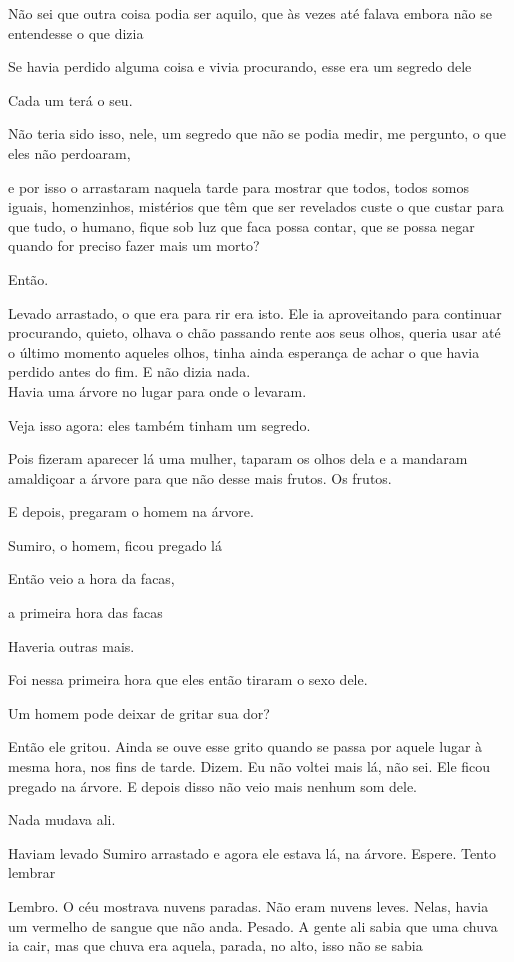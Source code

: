 Não sei que outra coisa podia ser aquilo, que às vezes até falava embora
não se entendesse o que dizia

Se havia perdido alguma coisa e vivia procurando, esse era um segredo
dele

Cada um terá o seu.

Não teria sido isso, nele, um segredo que não se podia medir, me
pergunto, o que eles não perdoaram,

e por isso o arrastaram naquela tarde para mostrar que todos, todos
somos iguais, homenzinhos, mistérios que têm que ser revelados custe o
que custar para que tudo, o humano, fique sob luz que faca possa contar,
que se possa negar quando for preciso fazer mais um morto?

Então.

Levado arrastado, o que era para rir era isto. Ele ia aproveitando para
continuar procurando, quieto, olhava o chão passando rente aos seus
olhos, queria usar até o último momento aqueles olhos, tinha ainda
esperança de achar o que havia perdido antes do fim. E não dizia nada.\\

Havia uma árvore no lugar para onde o levaram.

Veja isso agora: eles também tinham um segredo.

Pois fizeram aparecer lá uma mulher, taparam os olhos dela e a mandaram
amaldiçoar a árvore para que não desse mais frutos. Os frutos.

E depois, pregaram o homem na árvore.

Sumiro, o homem, ficou pregado lá

Então veio a hora da facas,

a primeira hora das facas

Haveria outras mais.

Foi nessa primeira hora que eles então tiraram o sexo dele.

Um homem pode deixar de gritar sua dor?

Então ele gritou. Ainda se ouve esse grito quando se passa por aquele
lugar à mesma hora, nos fins de tarde. Dizem. Eu não voltei mais lá, não
sei. Ele ficou pregado na árvore. E depois disso não veio mais nenhum
som dele.

Nada mudava ali.

Haviam levado Sumiro arrastado e agora ele estava lá, na árvore. Espere.
Tento lembrar

Lembro. O céu mostrava nuvens paradas. Não eram nuvens leves. Nelas,
havia um vermelho de sangue que não anda. Pesado. A gente ali sabia que
uma chuva ia cair, mas que chuva era aquela, parada, no alto, isso não
se sabia

